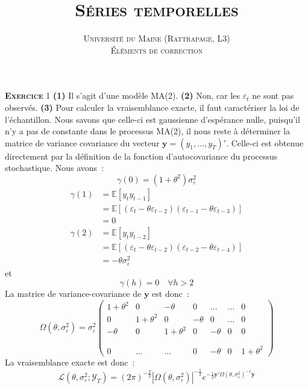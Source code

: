 \documentclass[10pt,a4paper,notitlepage]{article}
\newcommand{\exercice}[1]{\textsc{\textbf{Exercice}} #1}
\begin{document}
\title{\textsc{Séries temporelles}}
\author{\textsc{Université du Maine (Rattrapage, L3)}\\\textsc{Éléments de correction}}
\date{}

\maketitle

\exercice{1} \textbf{(1)} Il s'agit d'une modèle MA(2). \textbf{(2)}
Non, car les $\varepsilon_t$ ne sont pas observés.  \textbf{(3)} Pour
calculer la vraisemblance exacte, il faut caractériser la loi de
l'échantillon. Nous savons que celle-ci est gaussienne d'espérance
nulle, puisqu'il n'y a pas de constante dans le processus MA(2), il
nous reste à déterminer la matrice de variance covariance du vecteur
$\mathbf y = (y_1,\dots,y_T)'$. Celle-ci est obtenue directement par la
définition de la fonction d'autocovariance du processus
stochastique. Nous avons :
\[
 \gamma(0) = (1+\theta^2)\sigma_{\varepsilon}^2
\]
\[
  \begin{split}
    \gamma(1) &= \mathbb E [y_{t}y_{t-1}]\\
    &= \mathbb E [(\varepsilon_t - \theta \varepsilon_{t-2})(\varepsilon_{t-1} - \theta \varepsilon_{t-3})]\\
    &= 0
  \end{split}
\]
\[
  \begin{split}
    \gamma(2) &= \mathbb E [y_{t}y_{t-2}]\\
    &= \mathbb E [(\varepsilon_t - \theta \varepsilon_{t-2})(\varepsilon_{t-2} - \theta \varepsilon_{t-4})]\\
    &= -\theta \sigma_{\varepsilon}^2
  \end{split}
\]
et
\[
\gamma(h) = 0\quad\forall h>2
\]
La matrice de variance-covariance de $\mathbf y$ est donc :
\[
  \Omega(\theta, \sigma_{\varepsilon}^2) = \sigma_{\varepsilon}^2
  \begin{pmatrix}
    1+\theta^2 & 0 & -\theta & 0 & \dots & \dots & 0\\
    0 & 1+\theta^2 & 0 & -\theta & 0 &  \dots & 0\\
    -\theta & 0 & 1+\theta^2 & 0 & -\theta & 0 & 0\\
    &&&&&&\\
    &&&&&&\\
    0 & \dots & \dots  & 0  & -\theta  & 0 & 1+\theta^2
  \end{pmatrix}
\]
La vraisemblance exacte est donc :
\[
\mathcal L(\theta, \sigma_{\varepsilon}^2; \mathcal Y_T) = (2\pi)^{-\frac{T}{2}}|\Omega(\theta, \sigma_{\varepsilon}^2)|^{-\frac{1}{2}}e^{-\frac{1}{2}\mathbf y'\Omega(\theta, \sigma_{\varepsilon}^2)^{-1}\mathbf y} 
\]
\end{document}
